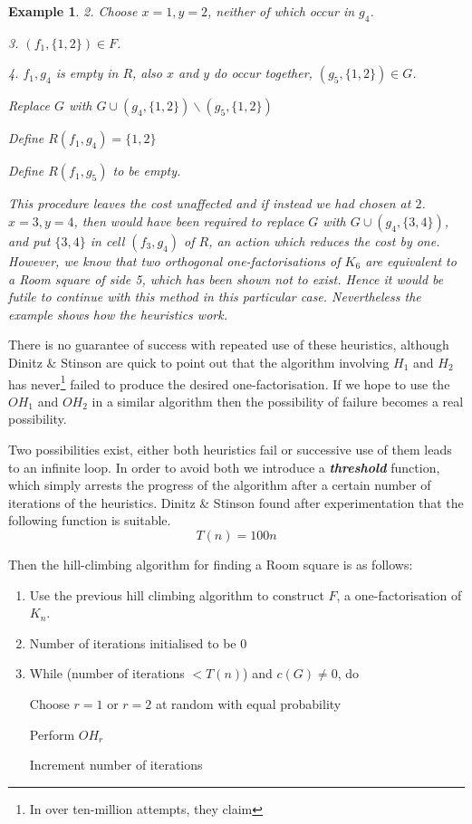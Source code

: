 \documentclass[
  11pt,
  a4paper]{book}
\newtheorem{example}{Example}
\begin{document}
\begin{example}
  2. Choose $x = 1, y = 2$, neither of which occur in $g_4$.

  3. $(f_1, \{1, 2\}) \in F$.

  4. $f_1, g_4$ is empty in $R$, also $x$ and $y$ do occur
     together, $(g_5, \{1, 2\}) \in G$.

       Replace $G$ with
       $G \cup (g_4, \{1, 2\}) \backslash (g_5, \{1, 2\})$

       Define $R(f_1, g_4) = \{1, 2\}$

       Define $R(f_1, g_5)$ to be empty.

This procedure leaves the cost unaffected and if instead we had
chosen at $2$. $x = 3, y = 4$, then would have been required to
replace $G$ with $G \cup (g_4,\{3,4\})$, and put $\{3,4\}$ in
cell $(f_3,g_4)$ of $R$, an action which reduces the cost by one.
However, we know that two orthogonal one-factorisations of $K_6$
are equivalent to a Room square of side 5, which has been shown
not to exist. Hence it would be futile to continue with this
method in this particular case. Nevertheless the example shows
how the heuristics work.
\end{example}

There is no guarantee of success with repeated use of these
heuristics, although Dinitz \& Stinson are quick to point out that
the algorithm involving \(H_1\) and \(H_2\) has never\footnote{In over ten-million attempts, they claim} failed to
produce the desired one-factorisation. If we hope to use the
\(OH_1\) and \(OH_2\) in a similar algorithm then the possibility of
failure becomes a real possibility.

Two possibilities exist, either both heuristics fail or
successive use of them leads to an infinite loop. In order to
avoid both we introduce a \textbf{\emph{threshold}} function, which simply
arrests the progress of the algorithm after a certain number of
iterations of the heuristics. Dinitz \& Stinson found after
experimentation that the following function is suitable.
\[T(n) = 100n\]

Then the hill-climbing algorithm for finding a Room square is as
follows:

\begin{enumerate}
\def\labelenumi{\arabic{enumi}.}
\item
  Use the previous hill climbing algorithm to construct \(F\),
  a one-factorisation of \(K_n\).
\item
  Number of iterations initialised to be \(0\)
\item
  While (number of iterations \(<T(n)\)) and \(c(G) \neq 0\),
  do

  Choose \(r=1\) or \(r=2\) at random with equal
  probability

  Perform \(OH_r\)

  Increment number of iterations
\end{enumerate}
\end{document}
